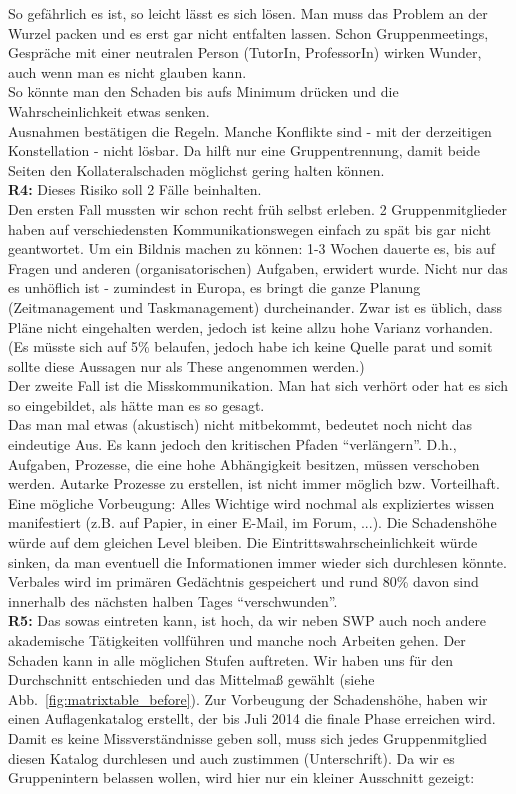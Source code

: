 \documentclass[fontsize=12pt,paper=a4,twoside]{scrartcl}
\begin{document}
So gefährlich es ist, so leicht lässt es sich lösen. Man muss das Problem an der Wurzel packen und es erst gar nicht entfalten lassen. Schon Gruppenmeetings, Gespräche mit einer neutralen Person (TutorIn, ProfessorIn) wirken Wunder, auch wenn man es nicht glauben kann.\\
So könnte man den Schaden bis aufs Minimum drücken und die Wahrscheinlichkeit etwas senken.\\
Ausnahmen bestätigen die Regeln. Manche Konflikte sind - mit der derzeitigen Konstellation - nicht lösbar. Da hilft nur eine Gruppentrennung, damit beide Seiten den Kollateralschaden möglichst gering halten können.\\

\textbf{R4:} Dieses Risiko soll 2 Fälle beinhalten.\\ Den ersten Fall mussten wir schon recht früh selbst erleben. 2 Gruppenmitglieder haben auf verschiedensten Kommunikationswegen einfach zu spät bis gar nicht geantwortet. Um ein Bildnis machen zu können: 1-3 Wochen dauerte es, bis auf Fragen und anderen (organisatorischen) Aufgaben, erwidert wurde. Nicht nur das es unhöflich ist - zumindest in Europa, es bringt die ganze Planung (Zeitmanagement und Taskmanagement) durcheinander. Zwar ist es üblich, dass Pläne nicht eingehalten werden, jedoch ist keine allzu hohe Varianz vorhanden. (Es müsste sich auf 5\% belaufen, jedoch habe ich keine Quelle parat und somit sollte diese Aussagen nur als These angenommen werden.)\\
Der zweite Fall ist die Misskommunikation. Man hat sich verhört oder hat es sich so eingebildet, als hätte man es so gesagt.\\
Das man mal etwas (akustisch) nicht mitbekommt, bedeutet noch nicht das eindeutige Aus. Es kann jedoch den kritischen Pfaden "`verlängern"'. D.h., Aufgaben, Prozesse, die eine hohe Abhängigkeit besitzen, müssen verschoben werden. Autarke Prozesse zu erstellen, ist nicht immer möglich bzw. Vorteilhaft.\\
Eine mögliche Vorbeugung: Alles Wichtige wird nochmal als expliziertes wissen manifestiert (z.B. auf Papier, in einer E-Mail, im Forum, ...). Die Schadenshöhe würde auf dem gleichen Level bleiben. Die Eintrittswahrscheinlichkeit würde sinken, da man eventuell die Informationen immer wieder sich durchlesen könnte. Verbales wird im primären Gedächtnis gespeichert und rund 80\% davon sind innerhalb des nächsten halben Tages "`verschwunden"'.\\ 


\textbf{R5:} Das sowas eintreten kann, ist hoch, da wir neben SWP auch noch andere akademische Tätigkeiten vollführen und manche noch Arbeiten gehen. Der Schaden kann in alle möglichen Stufen auftreten. Wir haben uns für den Durchschnitt entschieden und das Mittelmaß gewählt (siehe Abb.~\ref{fig:matrixtable_before}).
Zur Vorbeugung der Schadenshöhe, haben wir einen Auflagenkatalog erstellt, der bis Juli 2014 die finale Phase erreichen wird. Damit es keine Missverständnisse geben soll, muss sich jedes Gruppenmitglied diesen Katalog durchlesen und auch zustimmen (Unterschrift). Da wir es Gruppenintern belassen wollen, wird hier nur ein kleiner Ausschnitt gezeigt:\\
\end{document}
